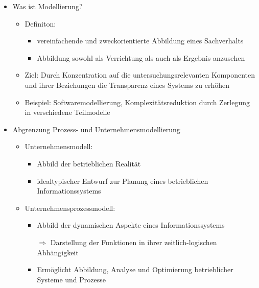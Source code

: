\documentclass[11pt,a4paper]{article}
\begin{document}
\begin{itemize}
\item Was ist Modellierung?
\item[] 
	\begin{itemize}
	\item Definiton:
		\begin{itemize}
		\item vereinfachende und zweckorientierte Abbildung eines Sachverhalts
		\item Abbildung sowohl als Verrichtung als auch als Ergebnis anzusehen
		\end{itemize}
	
	\item Ziel: Durch Konzentration auf die untersuchungsrelevanten Komponenten und ihrer Beziehungen die Transparenz eines Systems zu erhöhen
	\item Beispiel: Softwaremodellierung, Komplexitätsreduktion durch Zerlegung in verschiedene Teilmodelle
	\end{itemize}

\item Abgrenzung Prozess- und Unternehmensmodellierung
\item[] 
	\begin{itemize}
	\item Unternehmensmodell:
		\begin{itemize}
		\item Abbild der betrieblichen Realität
		\item idealtypischer Entwurf zur Planung eines betrieblichen Informationssystems
		\end{itemize}		 
		
	\item Unternehmensprozessmodell:
		\begin{itemize}
		\item Abbild der dynamischen Aspekte eines Informationssystems
		\item[$\Rightarrow$] Darstellung der Funktionen in ihrer zeitlich-logischen Abhängigkeit
		\item Ermöglicht Abbildung, Analyse und Optimierung betrieblicher Systeme und Prozesse
		\end{itemize}		 
	
	\end{itemize}

\end{itemize}
\end{document}
